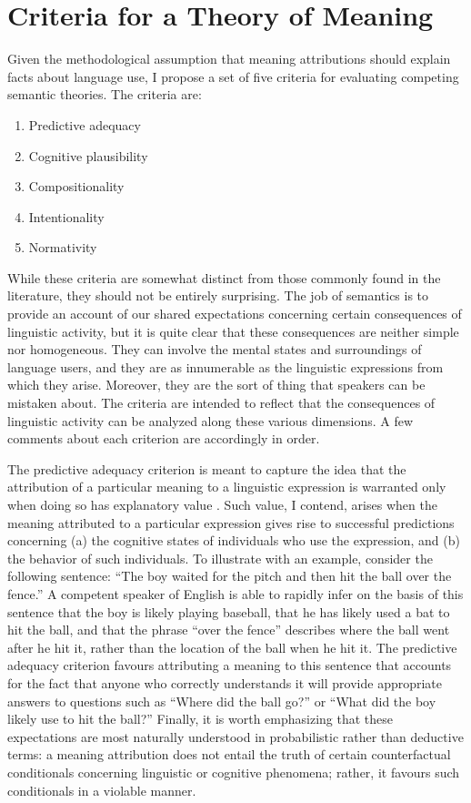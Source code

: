 \section{Criteria for a Theory of Meaning}

Given the methodological assumption that meaning attributions should explain facts about language use, I propose a set of five criteria for evaluating competing semantic theories. The criteria are:

\begin{enumerate}
  \item Predictive adequacy
  \item Cognitive plausibility
  \item Compositionality
  \item Intentionality
  \item Normativity
\end{enumerate}

\noindent
While these criteria are somewhat distinct from those commonly found in the literature, they should not be entirely surprising. The job of semantics is to provide an account of our shared expectations concerning certain consequences of linguistic activity, but it is quite clear that these consequences are neither simple nor homogeneous. They can involve the mental states and surroundings of language users, and they are as innumerable as the linguistic expressions from which they arise. Moreover, they are the sort of thing that speakers can be mistaken about. The criteria are intended to reflect that the consequences of linguistic activity can be analyzed along these various dimensions. A few comments about each criterion are accordingly in order.

The predictive adequacy criterion is meant to capture the idea that the attribution of a particular meaning to a linguistic expression is warranted only when doing so has explanatory value \citep[see][for related ideas]{Hochstein:2011,Dennett:1987}. Such value, I contend, arises when the meaning attributed to a particular expression gives rise to successful predictions concerning (a) the cognitive states of individuals who use the expression, and (b) the behavior of such individuals. To illustrate with an example, consider the following sentence: ``The boy waited for the pitch and then hit the ball over the fence.'' A competent speaker of English is able to rapidly infer on the basis of this sentence that the boy is likely playing baseball, that he has likely used a bat to hit the ball, and that the phrase ``over the fence'' describes where the ball went after he hit it, rather than the location of the ball when he hit it. The predictive adequacy criterion favours attributing a meaning to this sentence that accounts for the fact that anyone who correctly understands it will provide appropriate answers to questions such as ``Where did the ball go?'' or ``What did the boy likely use to hit the ball?'' Finally, it is worth emphasizing that these expectations are most naturally understood in probabilistic rather than deductive terms: a meaning attribution does not entail the truth of certain counterfactual conditionals concerning linguistic or cognitive phenomena; rather, it favours such conditionals in a violable manner.

